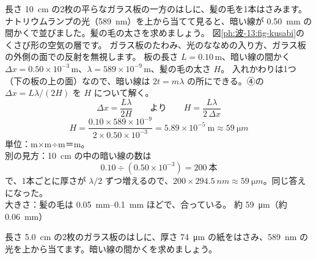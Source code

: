 \begin{phreidai}[髪の毛の太さを光ではかる]
\label{ph:波-13:ex7}長さ \qty{10}{cm} の2枚の平らなガラス板の一方のはしに、髪の毛を1本はさみます。ナトリウムランプの光（\qty{589}{nm}）を上から当てて見ると、暗い線が \qty{0.50}{mm} の間かくで並びました。髪の毛の太さを求めましょう。
\phbamen
図\ref{ph:波-13:fig-kusabi}のくさび形の空気の層です。
\phmushi
ガラス板のたわみ、光のななめの入り方、ガラス板の外側の面での反射を無視します。
\phzu
板の長さ $L=0.10$\,m、暗い線の間かく $\Delta x=0.50\times10^{-3}$\,m、$\lambda=589\times10^{-9}$\,m、髪の毛の太さ $H$。
\phriyu
入れかわりは1つ（下の板の上の面）なので、暗い線は $2t=m\lambda$ の所にできる。④の $\Delta x=L\lambda/(2H)$ を $H$ について解く。
\phtateru
\[ \Delta x=\frac{L\lambda}{2H}\qquad\text{より}\qquad H=\frac{L\lambda}{2\,\Delta x} \]
\phtoku
\[ H=\frac{0.10\times589\times10^{-9}}{2\times0.50\times10^{-3}}=5.89\times10^{-5}\ \mathrm{m}\approx\qty{59}{\micro m} \]
\phtashikame
単位：m×m÷m＝m。\\
別の見方：\qty{10}{cm} の中の暗い線の数は
\[ 0.10\div(0.50\times10^{-3})=200\ \text{本} \]
で、1本ごとに厚さが $\lambda/2$ ずつ増えるので、$200\times\qty{294.5}{nm}\approx\qty{59}{\micro m}$。同じ答えになった。\\
大きさ：髪の毛は \qtyrange{0.05}{0.1}{mm} ほどで、合っている。
\kotae 約 \qty{59}{\micro m}（約 \qty{0.06}{mm}）
\end{phreidai}
\begin{jibun}
長さ \qty{5.0}{cm} の2枚のガラス板のはしに、厚さ \qty{74}{\micro m} の紙をはさみ、\qty{589}{nm} の光を上から当てます。暗い線の間かくを求めましょう。
\end{jibun}

